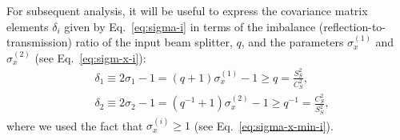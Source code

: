 \documentclass[%
reprint,
superscriptaddress,
 amsmath,amssymb,amsfonts,
 aps,
 pra,
 longbibliography
]{revtex4-2}
\newcommand{\ind}[1]{\mathrm{#1}}
\begin{document}



For subsequent analysis, it will be useful to express
the covariance matrix elements $\delta_i$ given by Eq.~\eqref{eq:sigma-i}
in
terms of the imbalance (reflection-to-transmission) ratio of the input beam splitter, $q$, and the
parameters $\sigma_{x}^{(1)}$ and $\sigma_{x}^{(2)}$ (see Eq.~\eqref{eq:sigm-x-i}):
\begin{subequations}
  \label{eq:delta_12}
\begin{align}
  \label{eq:delta_1}
  &
    \delta_1\equiv2\sigma_1-1=(q+1)\sigma_x^{(1)}-1\ge q=\frac{S_S^2}{C_S^2},
  \\
  &
    \label{eq:delta_2}
    \delta_2\equiv 2\sigma_2-1=(q^{-1}+1)\sigma_x^{(2)}-1\ge q^{-1}=\frac{C_S^2}{S_S^2},
\end{align}
\end{subequations}
where we used the fact that $\sigma_x^{(i)}\ge 1$ (see Eq.~\eqref{eq:sigma-x-min-i}).
\end{document}
